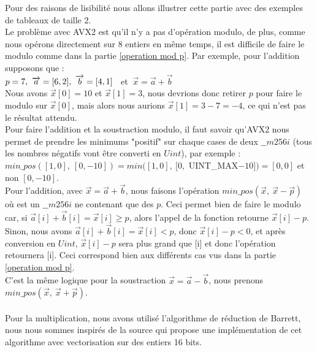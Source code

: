 \documentclass[12pt, a4paper]{article}
\begin{document}
Pour des raisons de lisibilité nous allons illustrer cette partie avec des exemples de tableaux de taille 2. \\
\indent Le problème avec AVX2 est qu'il n'y a pas d'opération modulo, de plus, comme nous opérons directement sur 8 entiers en même temps, il est difficile de faire le modulo comme dans la partie \ref{operation mod p}.
Par exemple, pour l'addition supposons que : \\
$p = 7, \ \overrightarrow{a} = [6, 2], \ \space \overrightarrow{b} = [4, 1]$ \ et $ \ \overrightarrow{x} = \overrightarrow{a}+\overrightarrow{b}$ \\
Nous avons $\overrightarrow{x}[0] = 10$ et $\overrightarrow{x}[1] = 3$, nous devrions donc retirer $p$ pour faire le modulo sur $\overrightarrow{x}[0]$, mais alors nous aurions $\overrightarrow{x}[1] = 3-7 = -4$, ce qui n'est pas le résultat attendu.\\ 
\indent Pour faire l'addition et la soustraction modulo, il faut savoir qu'AVX2 nous permet de prendre les minimums "positif" sur chaque cases de deux $\_\_m256i$ (tous les nombres négatifs vont être converti en $Uint$), par exemple :\\ $min\_pos([1, 0],\  [0, -10]) = min([1, 0], \ [0,$ UINT\_MAX$-10]) = [0, 0]$ et non $[0, -10]$. \\
\indent Pour l'addition, avec $\overrightarrow{x} = \overrightarrow{a}+\overrightarrow{b}$, nous faisons l'opération $min\_pos(\overrightarrow{x},\ \overrightarrow{x}-\overrightarrow{p})$ où  est un $\_\_m256i$ ne contenant que des $p$. Ceci permet bien de faire le modulo car, si \linebreak $\overrightarrow{a}[i] + \overrightarrow{b}[i] = \overrightarrow{x}[i] \geq p$, alors l'appel de la fonction retourne $\overrightarrow{x}[i] - p$. Sinon, nous avons \linebreak $\overrightarrow{a}[i] + \overrightarrow{b}[i] = \overrightarrow{x}[i] < p$, donc $\overrightarrow{x}[i]-p < 0$, et après conversion en $Uint$, $\overrightarrow{x}[i]-p$ sera plus grand que [i] et donc l'opération retournera [i]. Ceci correspond bien aux différents cas vus dans la partie \ref{operation mod p}. \\
C'est la même logique pour la soustraction $\overrightarrow{x} = \overrightarrow{a}-\overrightarrow{b}$, nous prenons $min\_pos(\overrightarrow{x},\ \overrightarrow{x}+\overrightarrow{p})$. \\ \\
\indent Pour la multiplication, nous avons utilisé l'algorithme de réduction de Barrett, nous nous sommes inspirés de la source \cite{SIMD} qui propose une implémentation de cet algorithme avec vectorisation sur des entiers 16 bits.
\end{document}

